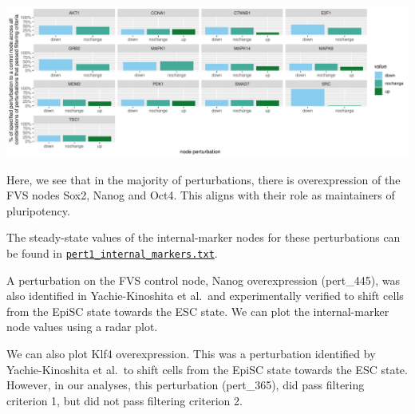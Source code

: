 \documentclass[
]{book}
\begin{document}
\begin{center}\includegraphics{_main_files/figure-latex/unnamed-chunk-41-1} \end{center}

Here, we see that in the majority of perturbations, there is overexpression of the FVS nodes Sox2, Nanog and Oct4. This aligns with their role as maintainers of pluripotency.

The steady-state values of the internal-marker nodes for these perturbations can be found in \href{https://github.com/VeraLiconaResearchGroup/Netisce/blob/main/ipsc_validation/results/pert1_internal_markers.txt}{\texttt{pert1\_internal\_markers.txt}}.

A perturbation on the FVS control node, Nanog overexpression (pert\_445), was also identified in Yachie-Kinoshita et al.~and experimentally verified to shift cells from the EpiSC state towards the ESC state. We can plot the internal-marker node values using a radar plot.

We can also plot Klf4 overexpression. This was a perturbation identified by Yachie-Kinoshita et al.~to shift cells from the EpiSC state towards the ESC state. However, in our analyses, this perturbation (pert\_365), did pass filtering criterion 1, but did not pass filtering criterion 2.
\end{document}
